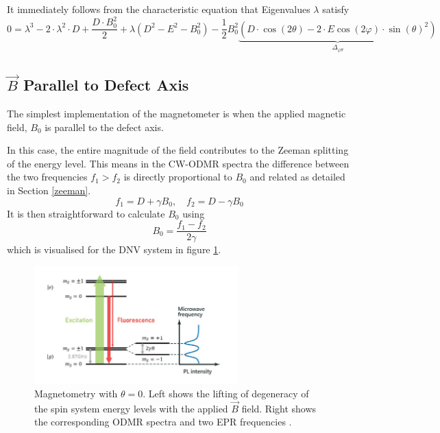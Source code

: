 It immediately follows from the characteristic  equation that Eigenvalues $\lambda$ satisfy 
\begin{equation}
    0 = \lambda^3 - 2\cdot \lambda^2 \cdot D + \frac{D \cdot B_0^2}{2} + \lambda(D^2 - E^2 - B_0^2) - \frac{1}{2}B_0^2\underbrace{\left(D \cdot \cos(2\theta) - 2 \cdot E \cos(2\varphi) \cdot \sin(\theta)^2\right)}_{\Delta_{\varphi \theta}}
    \label{eq:nv_spherical_characteristic_equation}
\end{equation}






\subsection{$\vec{B}$ Parallel to Defect Axis}
The simplest implementation of the magnetometer is when the applied magnetic field, $B_0$ is parallel to the defect axis. 

In this case, the entire magnitude of the field contributes to the Zeeman splitting of the energy level. This means in the CW-ODMR spectra the difference between the two frequencies $f_1 > f_2$ is directly proportional to $B_0$ and related as detailed in Section \ref{zeeman}.
$$f_1 = D + \gamma B_0,  \quad f_2 = D - \gamma B_0$$
It is then straightforward to calculate $B_0$ using 
$$B_0 = \frac{f_1 - f_2}{2 \gamma} $$
which is visualised for the DNV system in figure \ref{fig:spin1_magnetometry}. 

\begin{figure}[h]
    \begin{center}
    \includegraphics[width=0.7\textwidth]{figures/NVlevelwithESR.png}
    \end{center}
    \caption{Magnetometry with $\theta = 0$. Left shows the lifting of degeneracy of the spin system energy levels with the applied $\vec{B}$ field. Right shows the corresponding ODMR spectra and two EPR frequencies \cite{dnvweb}. }
\label{fig:spin1_magnetometry}
\end{figure}


